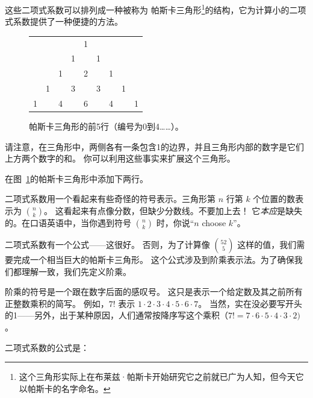 这些二项式系数可以排列成一种被称为 帕斯卡三角形\footnote{这个三角形实际上在布莱兹·帕斯卡开始研究它之前就已广为人知，但今天它以帕斯卡的名字命名。}的结构，它为计算小的二项式系数提供了一种便捷的方法。

\begin{figure}[!hbt]
  \begin{center}
    \begin{tabular}{ccccccccc}
        &   &   &   & 1 &   &   &   &   \\
        &   &   & 1 &   & 1 &   &   &   \\
        &   & 1 &   & 2 &
        & 1 &   &                       \\
        & 1 &   & 3 &   & 3 &   & 1 &   \\
      1 &   & 4 &   & 6 &   & 4 &   & 1 \\
    \end{tabular}
  \end{center}

  \vspace{.2in}

  \caption[帕斯卡三角形]{帕斯卡三角形的前5行（编号为0到4……）。}
  \label{fig:pascal}
\end{figure}

请注意，在三角形中，两侧各有一条包含1的边界，并且三角形内部的数字是它们上方两个数字的和。
你可以利用这些事实来扩展这个三角形。

\begin{exer}
  在图~\ref{fig:pascal}的帕斯卡三角形中添加下两行。
\end{exer}

二项式系数用一个看起来有些奇怪的符号表示。三角形第 $n$ 行第 $k$ 个位置的数表示为 $\displaystyle \binom{n}{k}$。
这看起来有点像分数，但缺少分数线。不要加上去！
它\emph{本应}是缺失的。在口语英语中，当你遇到符号 $\displaystyle \binom{n}{k}$ 时，你说“$n$ choose $k$”。

二项式系数有一个公式——这很好。
否则，为了计算像 $\displaystyle \binom{52}{5}$ 这样的值，我们需要完成一个相当巨大的帕斯卡三角形。
这个公式涉及到阶乘表示法。为了确保我们都理解一致，我们先定义阶乘。

阶乘的符号是一个跟在数字后面的感叹号。
这只是表示一个给定数及其之前所有正整数乘积的简写。
例如，$7!$ 表示 $1\cdot 2\cdot 3\cdot 4\cdot 5\cdot 6\cdot 7$。
当然，实在没必要写开头的1——另外，出于某种原因，人们通常按降序写这个乘积（$7! = 7 \cdot 6 \cdot 5 \cdot 4 \cdot 3 \cdot 2)$。

二项式系数的公式是：

